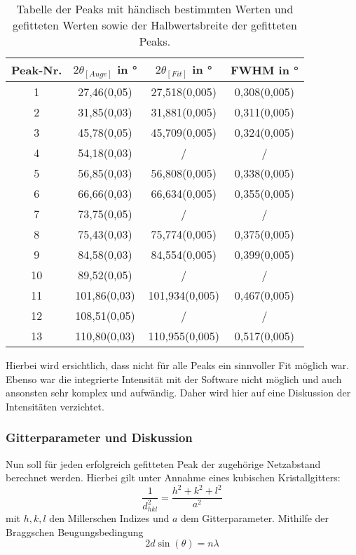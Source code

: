 \begin{table}[h!]
    \centering
     \begin{tabular}{|c|c|c|c|} 
     \hline
     Peak-Nr. & $2\theta_{[Auge]}$ in ° & $2\theta_{[Fit]}$ in ° & FWHM in ° \\ [0.5ex] 
     \hline\hline
     1 & \num{27,46(0,05)} & \num{27,518(0,005)} & \num{0,308(0,005)} \\ 
     2 & \num{31,85(0,03)} & \num{31,881(0,005)} & \num{0,311(0,005)} \\
     3 & \num{45,78(0,05)} & \num{45,709(0,005)} & \num{0,324(0,005)} \\
     4 & \num{54,18(0,03)} & / & / \\
     5 & \num{56,85(0,03)} & \num{56,808(0,005)} & \num{0,338(0,005)} \\ 
     6 & \num{66,66(0,03)} & \num{66,634(0,005)} & \num{0,355(0,005)} \\
     7 & \num{73,75(0,05)} & / & / \\
     8 & \num{75,43(0,03)} & \num{75,774(0,005)} & \num{0,375(0,005)} \\
     9 & \num{84,58(0,03)} & \num{84,554(0,005)} & \num{0,399(0,005)} \\
     10 & \num{89,52(0,05)} & / & / \\
     11 & \num{101,86(0,03)} & \num{101,934(0,005)} & \num{0,467(0,005)} \\
     12 & \num{108,51(0,05)} & / & / \\
     13 & \num{110,80(0,03)} & \num{110,955(0,005)} & \num{0,517(0,005)} \\  [1ex] 
     \hline
     \end{tabular}
     \caption[short]{Tabelle der Peaks mit händisch bestimmten Werten und gefitteten Werten sowie der Halbwertsbreite der gefitteten Peaks.}
     \label{tab:peaks}
\end{table}

Hierbei wird ersichtlich, dass nicht für alle Peaks ein sinnvoller Fit möglich war. Ebenso war die integrierte Intensität mit der Software nicht möglich und auch ansonsten sehr komplex und aufwändig. Daher wird hier auf eine Diskussion der Intensitäten verzichtet.

\subsubsection{Gitterparameter und Diskussion}

Nun soll für jeden erfolgreich gefitteten Peak der zugehörige Netzabstand berechnet werden. Hierbei gilt unter Annahme eines kubischen Kristallgitters:
\begin{equation}\label{eq:netzabstand}
    \frac{1}{d^2_{hkl}} = \frac{h^2 + k^2 + l^2}{a^2}
\end{equation}
mit $h, k, l$ den Millerschen Indizes und $a$ dem Gitterparameter. Mithilfe der Braggschen Beugungsbedingung
\begin{equation}
    2d\sin(\theta) = n\lambda
\end{equation}


